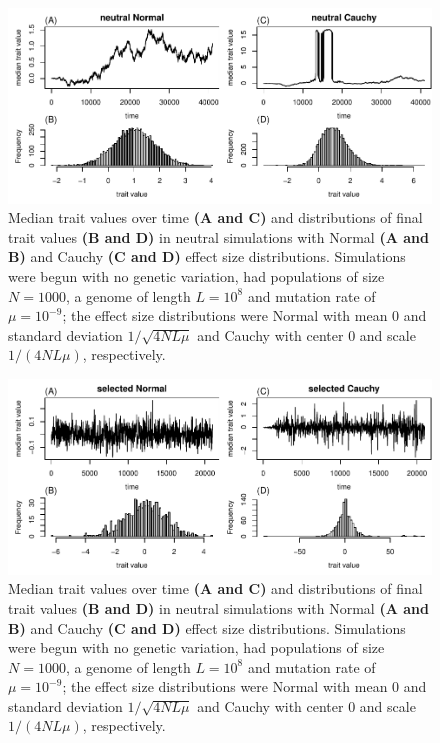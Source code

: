 \documentclass{article}
\theoremstyle{remark}
\theoremstyle{definition}
\begin{document}
\begin{figure}
    \begin{center}
        \includegraphics{sims/neutral_trait_traces}
    \end{center}
    \caption{
        Median trait values over time \textbf{(A and C)}
        and distributions of final trait values \textbf{(B and D)}
        in neutral simulations
        with Normal \textbf{(A and B)} and Cauchy \textbf{(C and D)}
        effect size distributions.
        Simulations were begun with no genetic variation,
        had populations of size $N=1000$,
        a genome of length $L=10^8$ and mutation rate of $\mu=10^{-9}$;
        the effect size distributions were
        Normal with mean 0 and standard deviation $1/\sqrt{4NL\mu}$
        and Cauchy with center 0 and scale $1/(4NL\mu)$, respectively.
        \label{fig:trait_distrns}
    }
\end{figure}

\begin{figure}
    \begin{center}
        \includegraphics{sims/selected_trait_traces}
    \end{center}
    \caption{
        Median trait values over time \textbf{(A and C)}
        and distributions of final trait values \textbf{(B and D)}
        in neutral simulations
        with Normal \textbf{(A and B)} and Cauchy \textbf{(C and D)}
        effect size distributions.
        Simulations were begun with no genetic variation,
        had populations of size $N=1000$,
        a genome of length $L=10^8$ and mutation rate of $\mu=10^{-9}$;
        the effect size distributions were
        Normal with mean 0 and standard deviation $1/\sqrt{4NL\mu}$
        and Cauchy with center 0 and scale $1/(4NL\mu)$, respectively.
        \label{fig:trait_distrns}
    }
\end{figure}
\end{document}
